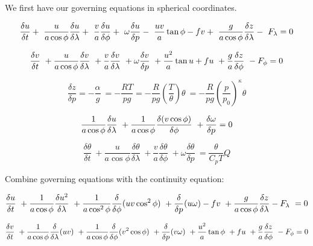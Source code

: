 \documentclass{article}
\begin{document}
We first have our governing equations in spherical coordinates.

\begin{equation}
\frac{\delta u}{\delta t} + \
\frac{u}{a\cos{\phi}} \frac{\delta u}{\delta \lambda}+ \
\frac{v}{a} \frac{\delta u}{\delta \phi} + \
\omega \frac{\delta u}{\delta p} - \
\frac{uv}{a} \tan{\phi} - fv + \
\frac{g}{a \cos{\phi}} \frac{\delta z}{\delta \lambda} - \
F_\lambda = 0
\label{ugov}
\end{equation}

\begin{equation}
\frac{\delta v}{\delta t} \
+ \frac{u}{a \cos{\phi}} \frac{\delta v}{\delta \lambda} \
+ \frac{v}{a} \frac{\delta v}{\delta \lambda} \
+ \omega \frac{\delta v}{\delta p} \
+ \frac{u^2}{a} \tan{u} + fu \
+ \frac{g}{a} \frac{\delta z}{\delta \phi} \
- F_\phi = 0
\label{vgov}
\end{equation}

\begin{equation}
\frac{\delta z}{\delta p} = - \frac{\alpha}{g} \
= - \frac{RT}{pg} = - \frac{R}{pg}(\frac{T}{\theta})\theta \
= - \frac{R}{pg}(\frac{p}{p_0})^\kappa \theta
\label{Zgov}
\end{equation}

\begin{equation}
\frac{1}{a \cos{\phi}} \frac{\delta u}{\delta \lambda} \
+ \frac{1}{a \cos{\phi}} \frac{\delta (v \cos{\phi})}{\delta \phi} \
+ \frac{\delta{\omega}}{\delta p} = 0
\label{cgov}
\end{equation}

\begin{equation}
\frac{\delta \theta}{\delta t} \
+ \frac{u}{a \cos{\phi}} \frac{\delta \theta}{\delta \lambda} \
+ \frac{v}{a} \frac{\delta \theta}{\delta \phi} \
+ \omega \frac{\delta \theta}{\delta p} \
= \frac{\theta}{C_p T} Q
\label{thetagov}
\end{equation}

Combine governing equations with the continuity equation:

\begin{equation}
\frac{\delta u}{\delta t} \
+ \frac{1}{a \cos{\phi}} \frac{\delta u^2}{\delta \lambda} \
+ \frac{1}{a \cos^2{\phi}} \frac{\delta}{\delta \phi}(uv\cos^2{\phi}) \
+ \frac{\delta}{\delta p}(u \omega) - fv \
+ \frac{g}{a \cos{\phi}} \frac{\delta z}{\delta \lambda} - F_\lambda \
= 0
\end{equation}

\begin{equation}
\frac{\delta v}{\delta t} \
+ \frac{1}{a \cos{\phi}} \frac{\delta}{\delta \lambda}(uv)\
+ \frac{1}{a \cos{\phi}} \frac{\delta}{\delta \phi}(v^2\cos{\phi}) \
+ \frac{\delta}{\delta p}(v \omega) \
+ \frac{u^2}{a} \tan{\phi} \
+ fu \
+ \frac{g}{a} \frac{\delta z}{\delta \phi} \
- F_\phi = 0
\end{equation}
\end{document}
